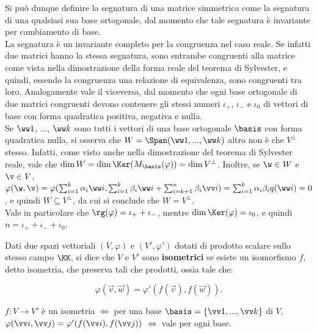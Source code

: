 \documentclass[11pt]{article}
\begin{document}
	\begin{remark} \nl
		\li Si può dunque definire la segnatura di una matrice simmetrica
		come la segnatura di una qualsiasi sua base ortogonale, dal
		momento che tale segnatura è invariante per cambiamento di base. \\
		\li La segnatura è un invariante completo per la congruenza nel caso reale. Se infatti due matrici hanno la stessa segnatura, sono
		entrambe congruenti alla matrice come vista nella dimostrazione
		della forma reale del teorema di Sylvester, e quindi, essendo
		la congruenza una relazione di equivalenza, sono congruenti
		tra loro. Analogamente vale il viceversa, dal momento che ogni
		base ortogonale di due matrici congruenti devono contenere gli
		stessi numeri $\iota_+$, $\iota_-$ e $\iota_0$ di vettori
		di base con forma quadratica positiva, negativa e nulla. \\
		\li Se $\ww 1$, ..., $\ww k$ sono tutti i vettori di una base
		ortogonale $\basis$ con forma quadratica nulla, si osserva che $W = \Span(\ww 1, ..., \ww k)$ altro non è che $V^\perp$ stesso. Infatti, come
		visto anche nella dimostrazione del teorema di Sylvester reale, vale
		che	$\dim W = \dim \Ker (M_\basis(\varphi)) = \dim V^\perp$. Inoltre,
		se $\w \in W$ e $\v \in V$, $\varphi(\w, \v) = \varphi(\sum_{i=1}^k \alpha_i \ww i, \sum_{i=1}^k \beta_i \ww i + \sum_{i=k+1}^n \beta_i \vv i) = \sum_{i=1}^k \alpha_i \beta_i q(\ww i) = 0$, e quindi
		$W \subseteq V^\perp$, da cui si conclude che $W = V^\perp$. \\
		\li Vale in particolare che $\rg(\varphi) = \iota_+ + \iota_-$, mentre
		$\dim \Ker(\varphi) = \iota_0$, e quindi $n = \iota_+ + \iota_- + \iota_0$.
	\end{remark}

	\begin{definition}
		Dati due spazi vettoriali $(V, \varphi)$ e
		$(V', \varphi')$ dotati di prodotto scalare sullo stesso campo $\KK$, si dice che
		$V$ e $V'$ sono \textbf{isometrici} se esiste un isomorfismo
		$f$, detto isometria, che preserva tali che prodotti, ossia tale che:
		
		\[ \varphi(\vec v, \vec w) = \varphi'(f(\vec v), f(\vec w)). \]
	\end{definition}

	\begin{exercise}\nl
		\li $f : V \to V'$ è un isometria $\iff$ per una base $\basis =
		\{\vv1, ..., \vv k\}$ di $V$, $\varphi(\vv i, \vv j) = \varphi'(f(\vv i), f(\vv j))$ $\iff$ vale per ogni base.
	\end{exercise}
\end{document}
